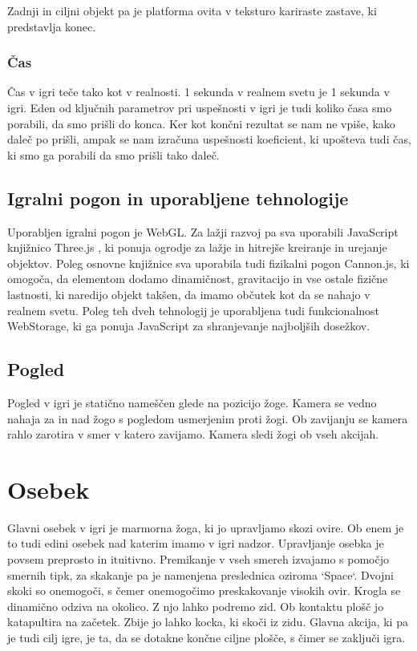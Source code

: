 \documentclass[a4paper]{article}
\begin{document}
 Zadnji  in ciljni objekt pa je platforma ovita v teksturo kariraste zastave, ki predstavlja konec.

\subsubsection{Čas}
Čas v igri teče tako kot v realnosti. 1 sekunda v realnem svetu je 1 sekunda v igri. Eden od ključnih parametrov pri uspešnosti v igri je tudi koliko časa smo porabili, da smo prišli do konca. Ker kot končni rezultat se nam ne vpiše, kako daleč po prišli, ampak se nam izračuna uspešnosti koeficient, ki upošteva tudi čas, ki smo ga porabili da smo prišli tako daleč.

\subsection{Igralni pogon in uporabljene tehnologije}
Uporabljen igralni pogon je WebGL. Za lažji razvoj pa sva uporabili JavaScript knjižnico Three.js , ki ponuja ogrodje za lažje in hitrejše kreiranje in urejanje objektov. Poleg osnovne knjižnice sva uporabila tudi fizikalni pogon Cannon.js, ki omogoča, da elementom dodamo dinamičnost, gravitacijo in vse ostale fizične lastnosti, ki naredijo objekt takšen, da imamo občutek kot da se nahajo v realnem svetu. 
Poleg teh dveh tehnologij je uporabljena tudi funkcionalnost WebStorage, ki ga ponuja JavaScript za shranjevanje najboljših dosežkov.

\subsection{Pogled}
Pogled v igri je statično nameščen glede na pozicijo žoge. Kamera se vedno nahaja za in nad žogo s pogledom usmerjenim proti žogi. Ob zavijanju se kamera rahlo zarotira v smer v katero zavijamo. Kamera sledi žogi ob vseh akcijah.

\section{Osebek}
Glavni osebek v igri je marmorna žoga, ki jo upravljamo skozi ovire. Ob enem je to tudi edini osebek nad katerim imamo v igri nadzor. Upravljanje osebka je povsem preprosto in ituitivno. Premikanje v vseh smereh izvajamo s pomočjo smernih tipk, za skakanje pa je namenjena preslednica oziroma  `Space`.  Dvojni skoki so onemogoči, s čemer onemogočimo preskakovanje visokih ovir. Krogla se dinamično odziva na okolico. Z njo lahko podremo zid. Ob kontaktu plošč jo katapultira na začetek. Zbije jo lahko kocka, ki skoči iz zidu. Glavna akcija, ki pa je tudi cilj igre, je ta, da se dotakne končne ciljne plošče, s čimer se zaključi igra.
\end{document}
